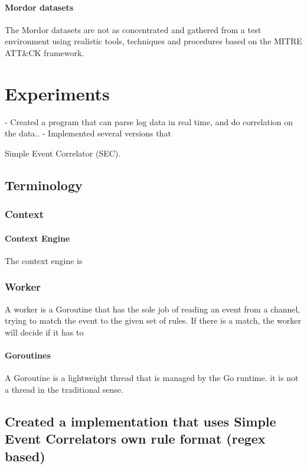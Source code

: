 \subsubsection{Mordor datasets}
The Mordor datasets are not as concentrated and gathered from a test environment using realistic tools, techniques and procedures based on the MITRE ATT\&CK framework.



\chapter{Experiments}
\label{chap:experiments}

- Created a program that can parse log data in real time, and do correlation on the data..
- Implemented several versions that


Simple Event Correlator (SEC).
\section{Terminology}
\subsection{Context}
\subsubsection{Context Engine}

The context engine is 

\subsection{Worker}

A worker is a Goroutine that has the sole job of reading an event from a channel, trying to match the event to the given set of rules. If there is a match, the worker will decide if it has to 

\subsubsection{Goroutines}

A Goroutine is a lightweight thread that is managed by the Go runtime. it is not a thread in the traditional sense.


\section{Created a implementation that uses Simple Event Correlators own rule format (regex based)}

